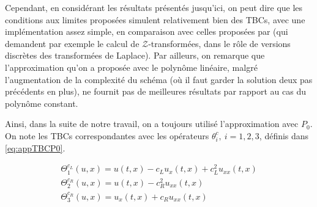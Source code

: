 \indent Cependant, en considérant les résultats présentés jusqu'ici, on peut dire que les conditions aux limites proposées simulent relativement bien des TBCs, avec une implémentation assez simple, en comparaison avec celles proposées par \cite{besse2015} (qui demandent par exemple le calcul de $\mathcal{Z}$-transformées, dans le rôle de versions discrètes des transformées de Laplace). Par ailleurs, on remarque que l'approximation qu'on a proposée avec le polynôme linéaire, malgré l'augmentation de la complexité du schéma (où il faut garder la solution deux pas précédents en plus), ne fournit pas de meilleures résultats par rapport au cas du polynôme constant.

\indent Ainsi, dans la suite de notre travail, on a toujours utilisé l'approximation avec $P_0$. On note les TBCs correspondantes avec les opérateurs $\theta_i^c, \ i=1,2,3$, définis dans \eqref{eq:appTBCP0}.

\begin{equation*}
    \begin{gathered}
        \Theta_1^{c_L}(u,x) = u(t,x) - c_L u_x(t,x)  + c_L^2  u_{xx}(t,x) \\
        \Theta_2^{c_R}(u,x) =  u(t,x) - c_R^2    u_{xx}(t,x)\\
        \Theta_3^{c_R} (u,x)= u_x(t,x) + c_R u_{xx}(t,x) 
    \end{gathered}
\end{equation*}